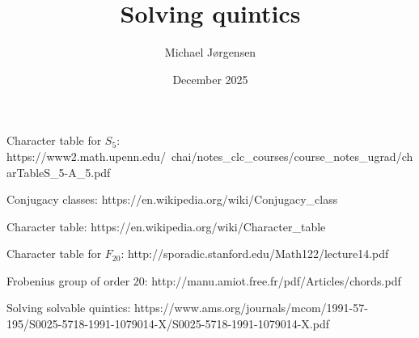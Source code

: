 \documentclass[12pt,oneside,a4paper]{article}
\title{Solving quintics}
\date{December 2025}
\author{Michael Jørgensen}
\begin{document}
\maketitle

Character table for $S_5$:
{https://www2.math.upenn.edu/~chai/notes_clc_courses/course_notes_ugrad/charTableS_5-A_5.pdf}

Conjugacy classes:
{https://en.wikipedia.org/wiki/Conjugacy_class}

Character table:
{https://en.wikipedia.org/wiki/Character_table}

Character table for $F_{20}$:
{http://sporadic.stanford.edu/Math122/lecture14.pdf}

Frobenius group of order 20:
{http://manu.amiot.free.fr/pdf/Articles/chords.pdf}

Solving solvable quintics:
{https://www.ams.org/journals/mcom/1991-57-195/S0025-5718-1991-1079014-X/S0025-5718-1991-1079014-X.pdf}
\end{document}
